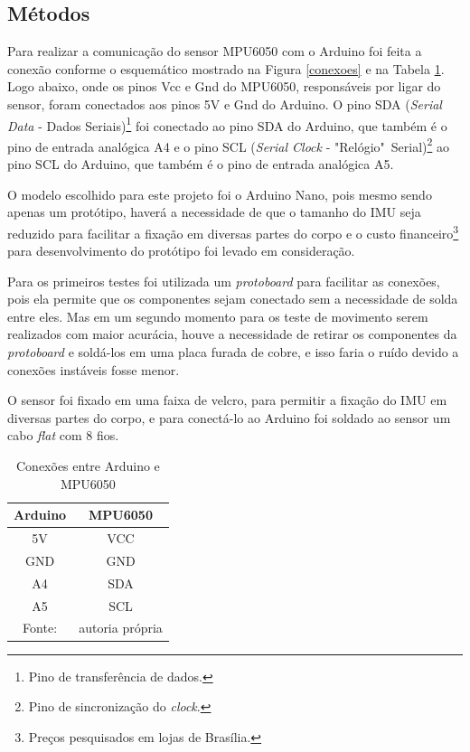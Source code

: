 	\subsection{Métodos}
		
		Para realizar a comunicação do sensor MPU6050 com o Arduino foi feita a conexão conforme o esquemático mostrado na Figura \ref{conexoes} e na Tabela \ref{conexoes_arduino}. Logo abaixo, onde os pinos Vcc e Gnd do MPU6050, responsáveis por ligar do sensor, foram conectados aos pinos 5V e Gnd do Arduino. O pino SDA (\textit{Serial Data} - Dados Seriais)\footnote{Pino de transferência de dados.} foi conectado ao pino SDA do Arduino, que também é o pino de entrada analógica A4 e o pino SCL (\textit{Serial Clock} - "Relógio"\ Serial)\footnote{Pino de sincronização do \textit{clock}.} ao pino SCL do Arduino, que também é o pino de entrada analógica A5.  
		
		O  modelo escolhido para este projeto foi o Arduino Nano, pois mesmo sendo apenas um protótipo, haverá a necessidade de que o tamanho do IMU seja reduzido para facilitar a fixação em diversas partes do corpo e o custo financeiro\footnote{Preços pesquisados em lojas de Brasília.} para desenvolvimento do protótipo foi levado em consideração.
		
		Para os primeiros testes foi utilizada um \textit{protoboard} para facilitar as conexões, pois ela permite que os componentes sejam conectado sem a necessidade de solda entre eles. Mas em um segundo momento para os teste de movimento serem realizados com maior acurácia, houve a necessidade de retirar os componentes da \textit{protoboard} e soldá-los em uma placa furada de cobre, e isso faria o ruído devido a conexões instáveis fosse menor.
		
		O sensor foi fixado em uma faixa de velcro, para permitir a fixação do IMU em diversas partes do corpo, e para conectá-lo ao Arduino foi soldado ao sensor um cabo \textit{flat} com 8 fios.
		
		\begin{table}[h] \footnotesize
			\centering
			\caption{Conexões entre Arduino e MPU6050}
			\label{conexoes_arduino}
			
			\begin{tabular}{cc}
				\toprule
				\textbf{Arduino} & \textbf{MPU6050} \\
				\midrule
				5V & VCC \\
				GND & GND \\
				A4 & SDA \\
				A5 & SCL \\
				\bottomrule
				Fonte: & autoria própria
			\end{tabular}
		\end{table}
		
